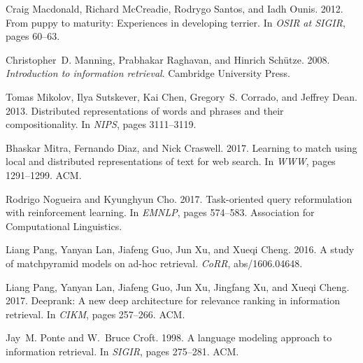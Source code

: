 \documentclass[11pt,a4paper]{article}
\begin{document}
\begin{thebibliography}{32}
	Craig Macdonald, Richard McCreadie, Rodrygo Santos, and Iadh Ounis. 2012.
	\newblock From puppy to maturity: Experiences in developing terrier.
	\newblock In \emph{{OSIR} at {SIGIR}}, pages 60--63.
	
	Christopher~D. Manning, Prabhakar Raghavan, and Hinrich Sch{\"{u}}tze. 2008.
	\newblock \emph{Introduction to information retrieval}.
	\newblock Cambridge University Press.
	
	Tomas Mikolov, Ilya Sutskever, Kai Chen, Gregory~S. Corrado, and Jeffrey Dean.
	2013.
	\newblock Distributed representations of words and phrases and their
	compositionality.
	\newblock In \emph{{NIPS}}, pages 3111--3119.
	
	Bhaskar Mitra, Fernando Diaz, and Nick Craswell. 2017.
	\newblock Learning to match using local and distributed representations of text
	for web search.
	\newblock In \emph{{WWW}}, pages 1291--1299. {ACM}.
	
	Rodrigo Nogueira and Kyunghyun Cho. 2017.
	\newblock Task-oriented query reformulation with reinforcement learning.
	\newblock In \emph{{EMNLP}}, pages 574--583. Association for Computational
	Linguistics.
	
	Liang Pang, Yanyan Lan, Jiafeng Guo, Jun Xu, and Xueqi Cheng. 2016.
	\newblock A study of matchpyramid models on ad-hoc retrieval.
	\newblock \emph{CoRR}, abs/1606.04648.
	
	Liang Pang, Yanyan Lan, Jiafeng Guo, Jun Xu, Jingfang Xu, and Xueqi Cheng.
	2017.
	\newblock Deeprank: {A} new deep architecture for relevance ranking in
	information retrieval.
	\newblock In \emph{{CIKM}}, pages 257--266. {ACM}.
	
    
    
	Jay~M. Ponte and W.~Bruce Croft. 1998.
	\newblock A language modeling approach to information retrieval.
	\newblock In \emph{{SIGIR}}, pages 275--281. {ACM}.
	

\end{thebibliography}
\end{document}
